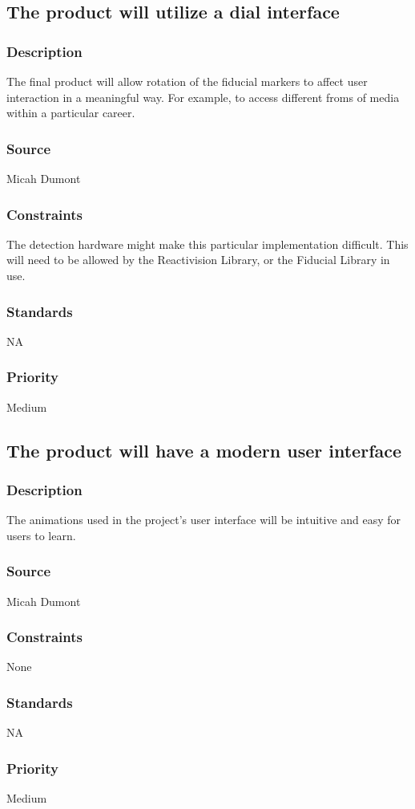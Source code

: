 \subsection{The product will utilize a dial interface}
\subsubsection{Description}
The final product will allow rotation of the fiducial markers to affect user interaction in a meaningful way. For example, to access different froms of media within a particular career.
\subsubsection{Source}
Micah Dumont
\subsubsection{Constraints}
The detection hardware might make this particular implementation difficult. This will need to be allowed by the Reactivision Library, or the Fiducial Library in use.
\subsubsection{Standards}
NA
\subsubsection{Priority}
Medium

\subsection{The product will have a modern user interface}
\subsubsection{Description}
The animations used in the project's user interface will be intuitive and easy for users to learn.
\subsubsection{Source}
Micah Dumont
\subsubsection{Constraints}
None
\subsubsection{Standards}
NA
\subsubsection{Priority}
Medium
